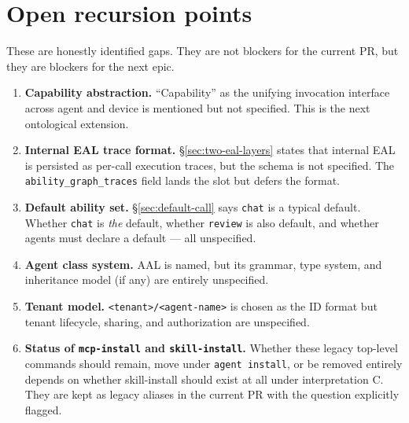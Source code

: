 \documentclass[11pt,a4paper]{article}
\begin{document}
\section{Open recursion points}
\label{sec:gaps}

These are honestly identified gaps. They are not blockers for the current PR,
but they are blockers for the next epic.

\begin{enumerate}[leftmargin=2em,itemsep=0.35em]
    \item \textbf{Capability abstraction.} ``Capability'' as the unifying
    invocation interface across agent and device is mentioned but not
    specified. This is the next ontological extension.

    \item \textbf{Internal EAL trace format.} \S\ref{sec:two-eal-layers}
    states that internal EAL is persisted as per-call execution traces, but
    the schema is not specified. The \texttt{ability\_graph\_traces} field
    lands the slot but defers the format.

    \item \textbf{Default ability set.} \S\ref{sec:default-call} says
    \texttt{chat} is a typical default. Whether \texttt{chat} is \emph{the}
    default, whether \texttt{review} is also default, and whether agents
    must declare a default --- all unspecified.

    \item \textbf{Agent class system.} AAL is named, but its grammar, type
    system, and inheritance model (if any) are entirely unspecified.

    \item \textbf{Tenant model.} \texttt{<tenant>/<agent-name>} is chosen as
    the ID format but tenant lifecycle, sharing, and authorization are
    unspecified.

    \item \textbf{Status of \texttt{mcp-install} and \texttt{skill-install}.}
    Whether these legacy top-level commands should remain, move under
    \texttt{agent install}, or be removed entirely depends on whether
    skill-install should exist at all under interpretation C. They are kept
    as legacy aliases in the current PR with the question explicitly
    flagged.
\end{enumerate}

\end{document}
